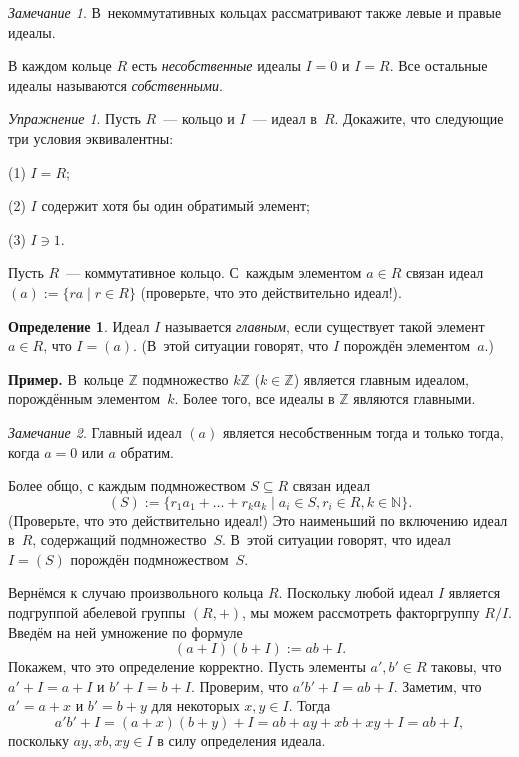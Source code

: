 \documentclass[a4paper,10pt]{amsart}
\def\ZZ{{\mathbb Z}}%
\def\NN{{\mathbb N}}%
\theoremstyle{definition}
\newtheorem{definition}{Определение}
\theoremstyle{remark}
\newtheorem{exercise}{Упражнение}
\newtheorem{remark}{Замечание}
\begin{document}
\begin{remark}
В~некоммутативных кольцах рассматривают также левые и правые идеалы.
\end{remark}

В каждом кольце $R$ есть {\it несобственные} идеалы $I=0$ и $I=R$.
Все остальные идеалы называются {\it собственными}.

\begin{exercise}
Пусть $R$~--- кольцо и $I$~--- идеал в~$R$. Докажите, что следующие
три условия эквивалентны:

(1) $I=R$;

(2) $I$ содержит хотя бы один обратимый элемент;

(3) $I \ni 1$.
\end{exercise}

Пусть $R$~--- коммутативное кольцо. С~каждым элементом $a \in R$
связан идеал $(a) := \{ ra \mid r \in R \}$ (проверьте, что это
действительно идеал!).

\begin{definition}
Идеал $I$ называется {\it главным}, если существует такой элемент
$a\in R$, что $I=(a)$. (В~этой ситуации говорят, что $I$ порождён
элементом~$a$.)
\end{definition}

\textbf{Пример.} В~кольце $\ZZ$ подмножество $k \ZZ$ ($k \in \ZZ$)
является главным идеалом, порождённым элементом~$k$. Более того, все
идеалы в $\ZZ$ являются главными.

\begin{remark}
Главный идеал $(a)$ является несобственным тогда и только тогда,
когда $a=0$ или $a$ обратим.
\end{remark}

Более общо, с каждым подмножеством $S \subseteq R$ связан идеал
$$
(S) := \{ r_1 a_1 + \ldots + r_k a_k \mid a_i \in S, r_i \in R,
k\in\NN\}.
$$
(Проверьте, что это действительно идеал!) Это наименьший по
включению идеал в~$R$, содержащий подмножество~$S$. В~этой ситуации
говорят, что идеал $I=(S)$ порождён подмножеством~$S$.

Вернёмся к случаю произвольного кольца $R$. Поскольку любой идеал
$I$ является подгруппой абелевой группы $(R,+)$, мы можем
рассмотреть факторгруппу $R/I$. Введём на ней умножение по формуле
$$
(a+I)(b+I) := ab + I.
$$
Покажем, что это определение корректно. Пусть элементы $a',b' \in R$
таковы, что $a' + I = a + I$ и $b' + I = b + I$. Проверим, что $a'b'
+ I = ab + I$. Заметим, что $a' = a + x$ и $b' = b + y$ для
некоторых $x, y \in I$. Тогда
$$
a'b' + I = (a + x)(b + y) + I = ab + ay + xb + xy + I = ab + I,
$$
поскольку $ay, xb, xy \in I$ в силу определения идеала.
\end{document}
